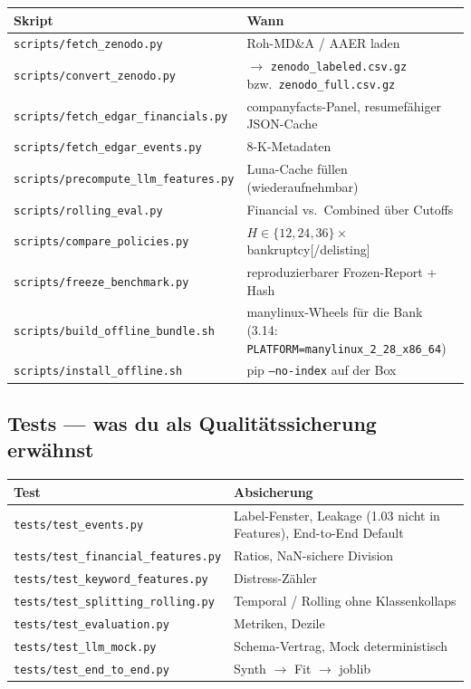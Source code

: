 \documentclass[11pt,a4paper]{article}
\newcommand{\file}[1]{\texttt{\small #1}}
\begin{document}
\begin{tabularx}{\textwidth}{@{}l X@{}}
\toprule
Skript & Wann \\
\midrule
\file{scripts/fetch\_zenodo.py} & Roh-MD\&A / AAER laden \\
\file{scripts/convert\_zenodo.py} & $\rightarrow$ \file{zenodo\_labeled.csv.gz} bzw.\ \file{zenodo\_full.csv.gz} \\
\file{scripts/fetch\_edgar\_financials.py} & companyfacts-Panel, resumefähiger JSON-Cache \\
\file{scripts/fetch\_edgar\_events.py} & 8-K-Metadaten \\
\file{scripts/precompute\_llm\_features.py} & Luna-Cache füllen (wiederaufnehmbar) \\
\file{scripts/rolling\_eval.py} & Financial vs.\ Combined über Cutoffs \\
\file{scripts/compare\_policies.py} & $H\in\{12,24,36\}\times$ bankruptcy[/delisting] \\
\file{scripts/freeze\_benchmark.py} & reproduzierbarer Frozen-Report + Hash \\
\file{scripts/build\_offline\_bundle.sh} & manylinux-Wheels für die Bank (3.14: \texttt{PLATFORM=manylinux\_2\_28\_x86\_64}) \\
\file{scripts/install\_offline.sh} & pip \texttt{--no-index} auf der Box \\
\bottomrule
\end{tabularx}

\subsection{Tests --- was du als Qualitätssicherung erwähnst}

\begin{tabularx}{\textwidth}{@{}l X@{}}
\toprule
Test & Absicherung \\
\midrule
\file{tests/test\_events.py} & Label-Fenster, Leakage (1.03 nicht in Features), End-to-End Default \\
\file{tests/test\_financial\_features.py} & Ratios, NaN-sichere Division \\
\file{tests/test\_keyword\_features.py} & Distress-Zähler \\
\file{tests/test\_splitting\_rolling.py} & Temporal / Rolling ohne Klassenkollaps \\
\file{tests/test\_evaluation.py} & Metriken, Dezile \\
\file{tests/test\_llm\_mock.py} & Schema-Vertrag, Mock deterministisch \\
\file{tests/test\_end\_to\_end.py} & Synth $\rightarrow$ Fit $\rightarrow$ joblib \\
\bottomrule
\end{tabularx}
\end{document}
